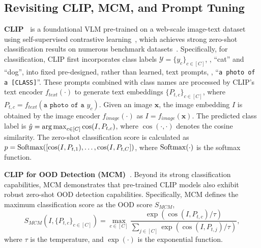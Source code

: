 \subsection{Revisiting CLIP, MCM, and Prompt Tuning}

\textbf{CLIP~\cite{radford_learning_2021}} is a foundational VLM pre-trained on a web-scale image-text dataset using self-supervised contrastive learning~\cite{DBLP:conf/icml/ChenK0H20}, which achieves strong zero-shot classification results on numerous benchmark datasets~\cite{krizhevskyImagenetClassificationDeep2012,li_caltech_2022,bossardFood101MiningDiscriminative2014,majiFineGrainedVisualClassification2013,parkhi_cats_2012}. 
Specifically, for classification, CLIP first incorporates class labels $\mathcal{Y} = \{y_{c}\}_{c\in[C]}$, \eg, ``cat'' and ``dog'', into fixed pre-designed, rather than learned, text prompts, \eg, ``\texttt{a photo of a [CLASS]}''.
These prompts combined with class names %
are processed by CLIP’s text encoder $f_{\textit{text}}(\cdot)$ to generate text embeddings $\{P_{t,c}\}_{c\in[C]}$, where $P_{t,c} = f_{\textit{text}}(\texttt{a photo of a }y_c)$. 
Given an image $\mathbf{x}$, the image embedding $I$ is obtained by the image encoder $f_{\textit{image}}(\cdot)$ as $I = f_{\textit{image}}(\mathbf{x})$. 
The predicted class label is $\hat{y} = \operatorname*{arg\,max}_{c \in [C]} \operatorname{cos}(I, P_{t,c})$, where $\operatorname{cos}(\cdot, \cdot)$ denotes the cosine similarity. 
The zero-shot classification score is calculated as $p = \operatorname*{Softmax}([\operatorname{cos}(I, P_{t,1}), \ldots, \operatorname{cos}(I, P_{t,C}])$, where $\operatorname*{Softmax}(\cdot)$ is the softmax function. 

\noindent
\textbf{CLIP for OOD Detection (MCM)~\cite{ming2022delving}}.
Beyond its strong classification capabilities, MCM demonstrates that pre-trained CLIP models also exhibit robust zero-shot OOD detection capabilities. 
Specifically, MCM defines the maximum classification score as the OOD score $S_{\textit{MCM}}$,
\begin{equation}
\label{eq: MCM}
    S_{\textit{MCM}} (I ,\{P_{t,c}\}_{c\in[C]}) = \max_{c\in [C]} \frac{\exp(\operatorname{cos}(I, P_{t,c}) / \tau)}{\sum_{j\in[C]} \exp(\operatorname{cos}(I, P_{t,j}) / \tau)},
\end{equation}
where $\tau$ is the temperature, and $\exp(\cdot)$ is the exponential function.

